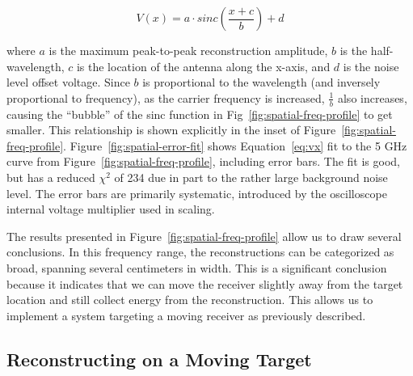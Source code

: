 \begin{equation}
\label{eq:vx}
V(x) = a\cdot sinc\left(\frac{x+c}{b}\right) + d
\end{equation}

where $a$ is the maximum peak-to-peak reconstruction amplitude, $b$ is the half-wavelength, $c$ is the location of the antenna along the x-axis, and $d$ is the noise level
offset voltage. Since $b$ is proportional to the wavelength (and inversely proportional
to frequency), as the carrier frequency is increased,  $\frac{1}{b}$ also increases, causing the ``bubble'' of the sinc function in Fig~\ref{fig:spatial-freq-profile} to get smaller. This relationship is shown explicitly in the inset of Figure~\ref{fig:spatial-freq-profile}. Figure~\ref{fig:spatial-error-fit} shows Equation~\ref{eq:vx} fit to the 5 GHz curve from Figure~\ref{fig:spatial-freq-profile}, including error bars. The fit is good, but has a reduced $\chi^2$ of 234 due in part to the rather large background noise level. The error bars are primarily systematic, introduced by the oscilloscope internal voltage multiplier used in scaling.


The results presented in Figure~\ref{fig:spatial-freq-profile} allow us to draw several conclusions. In this frequency range, the reconstructions can be categorized as broad, spanning several centimeters in width. This is a significant conclusion because it indicates that we can move the receiver slightly away from the target location and still collect energy from the reconstruction. This allows us to implement a system targeting a moving receiver as previously described.

\subsection{Reconstructing on a Moving Target}
\label{sec:recon-moving}

